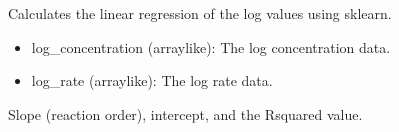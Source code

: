 \documentclass[a4paper,10pt,english]{sphinxmanual}
\begin{document}
\begin{fulllineitems}
\label{\detokenize{utils:src.utils.regression_analysis.calculate_regression}}
\pysigstartsignatures
{}
\pysigstopsignatures
\sphinxAtStartPar
Calculates the linear regression of the log values using sklearn.
\begin{description}
\begin{itemize}
\item {} 
\sphinxAtStartPar
log\_concentration (array\sphinxhyphen{}like): The log concentration data.

\item {} 
\sphinxAtStartPar
log\_rate (array\sphinxhyphen{}like): The log rate data.

\end{itemize}

\sphinxAtStartPar
Slope (reaction order), intercept, and the R\sphinxhyphen{}squared value.

\end{description}

\end{fulllineitems}

\end{document}
